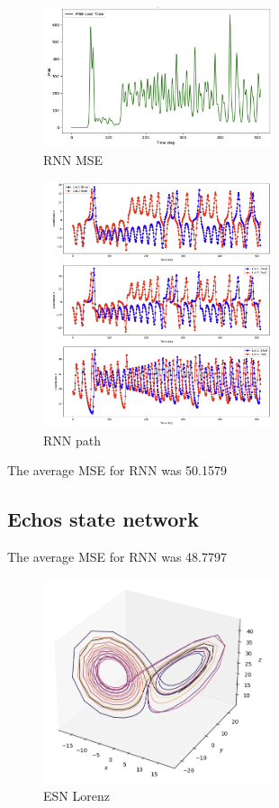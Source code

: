 \documentclass[11pt]{article}
\begin{document}
\begin{figure}[h]
\centering
\includegraphics[width=0.6\textwidth]{rnn_mse.jpeg}
\caption{RNN MSE}
\end{figure}

\begin{figure}[h]
\centering
\includegraphics[width=0.6\textwidth]{rnn_path.jpeg}
\caption{RNN path}
\end{figure}

The average MSE for RNN was 50.1579

\subsection{Echos state network}
The average MSE for RNN was 48.7797

\begin{figure}[h]
\centering
\includegraphics[width=0.6\textwidth]{echo_lorenz.jpeg}
\caption{ESN Lorenz}
\end{figure}
\end{document}
